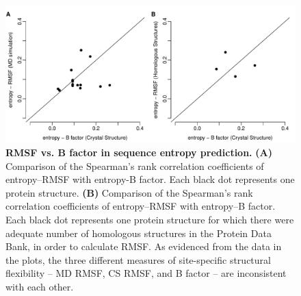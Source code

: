 \documentclass[12pt]{article}
\begin{document}
            \begin{figure}[tbh]
            \begin{center}
                \includegraphics[height=0.35\textheight]{cor_entropy_bfca_rmsf.pdf}
            \end{center}
            \caption{
                     {\bf RMSF vs. B factor in sequence entropy prediction.} {\bf (A)} Comparison of the Spearman's rank correlation coefficients of entropy--RMSF with entropy-B factor. Each black dot represents one protein structure. {\bf (B)} Comparison of the Spearman's rank correlation coefficients of entropy--RMSF with entropy--B factor. Each black dot represents one protein structure for which there were adequate number of homologous structures in the Protein Data Bank, in order to calculate RMSF. As evidenced from the data in the plots, the three different measures of site-specific structural flexibility -- MD RMSF, CS RMSF, and B factor -- are inconsistent with each other.
                     }
            \label{fig:cor_entropy_bfca_rmsf}
            \end{figure}

	
\end{document}
